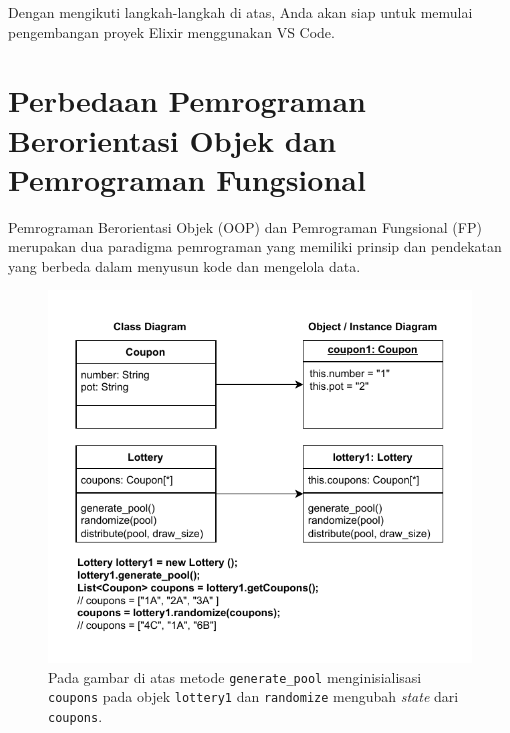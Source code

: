 Dengan mengikuti langkah-langkah di atas, Anda akan siap untuk memulai pengembangan proyek Elixir menggunakan VS Code.

\section{Perbedaan Pemrograman Berorientasi Objek dan Pemrograman Fungsional}

Pemrograman Berorientasi Objek (OOP) dan Pemrograman Fungsional (FP) merupakan dua paradigma pemrograman yang memiliki prinsip dan pendekatan yang berbeda dalam menyusun kode dan mengelola data.

\begin{figure}[h]
	\centering
	\includegraphics[width=\textwidth]{../assets/object-oriented.pdf}
	\caption{Pada gambar di atas metode \texttt{generate\_pool} menginisialisasi \texttt{coupons} pada objek \texttt{lottery1} dan \texttt{randomize} mengubah \textit{state} dari \texttt{coupons}.}
	\label{fig:ilustrasi-oop}
\end{figure}

